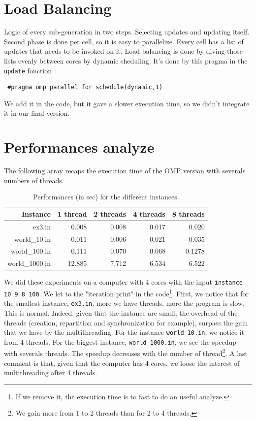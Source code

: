 \documentclass[a4paper,10pt]{article}
\begin{document}
\section*{Load Balancing}
Logic of every sub-generation in two steps. 
Selecting updates and updating itself. 
Second phase is done per cell, so it is easy to parallelize. 
Every cell has a list of updates that needs to be invoked on it. 
Load balancing is done by diving those lists evenly between cores by dynamic sheduling. It's done by this pragma
in the \texttt{update} fonction :

\begin{lstlisting}
 #pragma omp parallel for schedule(dynamic,1)
\end{lstlisting}

We add it in the code, but it gave a slower execution time, so we didn't integrate it in our final version.

\section*{Performances analyze}

The following array recaps the execution time of the OMP version with severals numbers of threads.
\begin{table}[!ht]
\centering
\begin{tabular}{|r||r|r|r|r|}
  \hline
    Instance     & 1 thread   & 2 threads   & 4 threads  & 8 threads  \\
  \hline
    ex3.in       &  0.008     & 0.008        & 0.017       &  0.020 \\ 
  \hline
    world\_10.in &  0.011      &  0.006       & 0.021       & 0.035 \\ 
  \hline
   world\_100.in &  0.111      & 0.070        & 0.068      & 0.1278 \\ 
  \hline
  world\_1000.in &  12.885   & 7.712       & 6.534      &  6.522 \\ 
  \hline
\end{tabular}
\caption{Performances (in sec) for the different instances.}
\end{table}

We did these experiments on a computer with 4 cores with the input \texttt{instance 10 9 8 100}. We
let to the "iteration print" in the code\footnote{If we remove it, the execution time is to fast to do an useful analyze.}.
First, we notice that for the smallest instance, \texttt{ex3.in},
more we have threads, more the program is slow. This is normal. Indeed, given that the instance are small, the overhead of the threads (creation, repartition and
synchronization for example), surpass the gain that we have by the multithreading.
For the instance \texttt{world\_10.in}, we notice it from 4 threads.
For the biggest instance, \texttt{world\_1000.in}, we see the speedup with severals threads. The speedup decreases with the number
of thread\footnote{We gain more from 1 to 2 threads than for 2 to 4 threads.}.
A last comment is that, given that the computer has 4 cores, we loose the interest of multithreading after 4 threads.
\\
\end{document}

